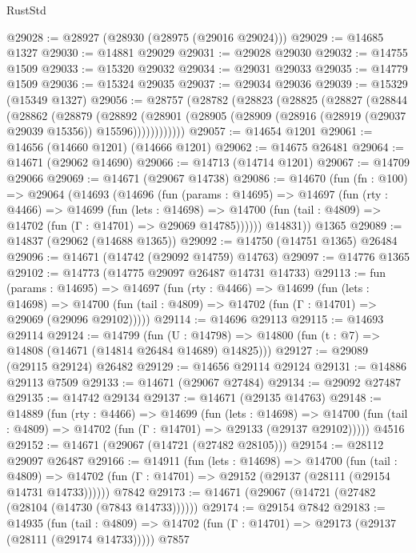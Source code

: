 \begin{lexlean}{RustStd}
\begin{coremodule}
@29028 := @28927 (@28930 (@28975 (@29016 @29024)))
@29029 := @14685 @1327
@29030 := @14881 @29029
@29031 := @29028 @29030
@29032 := @14755 @1509
@29033 := @15320 @29032
@29034 := @29031 @29033
@29035 := @14779 @1509
@29036 := @15324 @29035
@29037 := @29034 @29036
@29039 := @15329 (@15349 @1327)
@29056 := @28757
    (@28782
      (@28823
        (@28825
          (@28827
            (@28844
              (@28862
                (@28879
                  (@28892
                    (@28901
                      (@28905 (@28909 (@28916 (@28919 (@29037 @29039 @15356)) @15596))))))))))))
@29057 := @14654 @1201
@29061 := @14656 (@14660 @1201) (@14666 @1201)
@29062 := @14675 @26481
@29064 := @14671 (@29062 @14690)
@29066 := @14713 (@14714 @1201)
@29067 := @14709 @29066
@29069 := @14671 (@29067 @14738)
@29086 := @14670
    (fun (fn : @100) =>
    @29064
      (@14693
        (@14696
          (fun (params : @14695) =>
          @14697
            (fun (rty : @4466) =>
            @14699
              (fun (lets : @14698) =>
              @14700 (fun (tail : @4809) => @14702 (fun (Γ : @14701) => @29069 @14785))))))
        @14831))
    @1365
@29089 := @14837 (@29062 (@14688 @1365))
@29092 := @14750 (@14751 @1365) @26484
@29096 := @14671 (@14742 (@29092 @14759) @14763)
@29097 := @14776 @1365
@29102 := @14773 (@14775 @29097 @26487 @14731 @14733)
@29113 := fun (params : @14695) =>
  @14697
    (fun (rty : @4466) =>
    @14699
      (fun (lets : @14698) =>
      @14700 (fun (tail : @4809) => @14702 (fun (Γ : @14701) => @29069 (@29096 @29102)))))
@29114 := @14696 @29113
@29115 := @14693 @29114
@29124 := @14799
    (fun (U : @14798) => @14800 (fun (t : @7) => @14808 (@14671 (@14814 @26484 @14689) @14825)))
@29127 := @29089 (@29115 @29124) @26482
@29129 := @14656 @29114 @29124
@29131 := @14886 @29113 @7509
@29133 := @14671 (@29067 @27484)
@29134 := @29092 @27487
@29135 := @14742 @29134
@29137 := @14671 (@29135 @14763)
@29148 := @14889
    (fun (rty : @4466) =>
    @14699
      (fun (lets : @14698) =>
      @14700 (fun (tail : @4809) => @14702 (fun (Γ : @14701) => @29133 (@29137 @29102)))))
    @4516
@29152 := @14671 (@29067 (@14721 (@27482 @28105)))
@29154 := @28112 @29097 @26487
@29166 := @14911
    (fun (lets : @14698) =>
    @14700
      (fun (tail : @4809) =>
      @14702 (fun (Γ : @14701) => @29152 (@29137 (@28111 (@29154 @14731 @14733))))))
    @7842
@29173 := @14671 (@29067 (@14721 (@27482 (@28104 (@14730 (@7843 @14733))))))
@29174 := @29154 @7842
@29183 := @14935
    (fun (tail : @4809) => @14702 (fun (Γ : @14701) => @29173 (@29137 (@28111 (@29174 @14733)))))
    @7857

\end{coremodule}
\end{lexlean}
